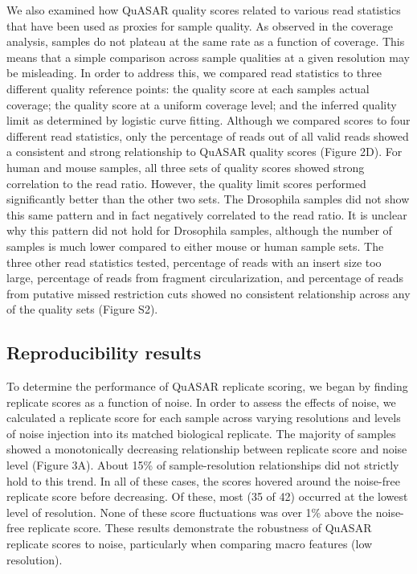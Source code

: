 We also examined how QuASAR quality scores related to various read statistics that have been used as proxies for sample quality. As observed in the coverage analysis, samples do not plateau at the same rate as a function of coverage. This means that a simple comparison across sample qualities at a given resolution may be misleading. In order to address this, we compared read statistics to three different quality reference points: the quality score at each samples actual coverage; the quality score at a uniform coverage level; and the inferred quality limit as determined by logistic curve fitting. Although we compared scores to four different read statistics, only the percentage of \cis reads out of all valid reads showed a consistent and strong relationship to QuASAR quality scores (Figure 2D). For human and mouse samples, all three sets of quality scores showed strong correlation to the \cis read ratio. However, the quality limit scores performed significantly better than the other two sets. The Drosophila samples did not show this same pattern and in fact negatively correlated to the \cis read ratio. It is unclear why this pattern did not hold for Drosophila samples, although the number of samples is much lower compared to either mouse or human sample sets. The three other read statistics tested, percentage of reads with an insert size too large, percentage of reads from fragment circularization, and percentage of reads from putative missed restriction cuts showed no consistent relationship across any of the quality sets (Figure S2).

\subsection{Reproducibility results}

To determine the performance of QuASAR replicate scoring, we began by finding replicate scores as a function of noise. In order to assess the effects of noise, we calculated a replicate score for each sample across varying resolutions and levels of noise injection into its matched biological replicate. The majority of samples showed a monotonically decreasing relationship between replicate score and noise level (Figure 3A). About 15\% of sample-resolution relationships did not strictly hold to this trend. In all of these cases, the scores hovered around the noise-free replicate score before decreasing. Of these, most (35 of 42) occurred at the lowest level of resolution. None of these score fluctuations was over 1\% above the noise-free replicate score. These results demonstrate the robustness of QuASAR replicate scores to noise, particularly when comparing macro features (low resolution).

